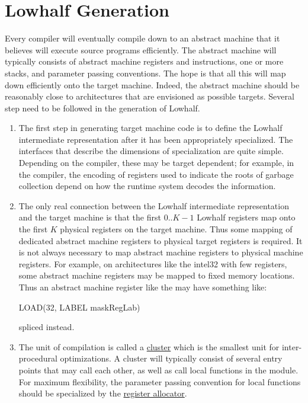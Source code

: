 \section{Lowhalf Generation}
  Every compiler will eventually compile down to an abstract machine
  that it believes will execute source programs efficiently. The
  abstract machine will typically consists of abstract machine
  registers and instructions, one or more stacks, and parameter
  passing conventions.  The hope is that all this will map down
  efficiently onto the target machine. Indeed, the abstract machine
  should be reasonably close to architectures that are envisioned as
  possible targets. Several step need to be followed in the generation
  of Lowhalf.

  \begin{enumerate}
   \item The first step in generating target machine code is to define
   the Lowhalf intermediate representation after it has been
   appropriately specialized. The interfaces that describe the
   dimensions of specialization are quite simple. Depending on the
   compiler, these may be target dependent; for example, in the
   compiler, the encoding of registers used to indicate the roots of
   garbage collection depend on how the runtime system decodes the
   information.

  \item The only real connection between the Lowhalf intermediate
  representation and the target machine is that the first
  $0..K-1$ Lowhalf registers map onto the first $K$
  physical registers on the target machine. Thus some mapping of
  dedicated abstract machine registers to physical target registers is
  required. It is not always necessary to map abstract machine
  registers to physical machine registers. For example, on
  architectures like the intel32 with few registers, some abstract machine
  registers may be mapped to fixed memory locations. Thus an abstract
  machine register like the  may have something like:
\begin{SML}
  LOAD(32, LABEL maskRegLab) 
\end{SML}
spliced instead.

  \item The unit of compilation is called a 
   \href{cluster.html}{cluster} which
  is the smallest unit for inter-procedural optimizations. A cluster
  will typically consist of several entry points that may call each
  other, as well as call local functions in the module. For maximum
  flexibility, the parameter passing convention for local functions
  should be specialized by the \href{lowhalf-ra.html}{register allocator}.


\end{enumerate}
